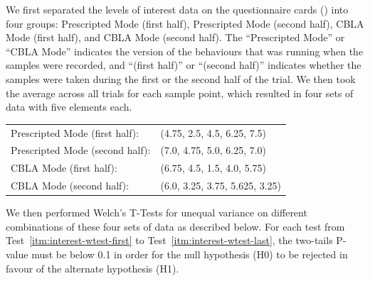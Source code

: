 We first separated the levels of interest data on the questionnaire cards () into four groups: Prescripted Mode (first half),  Prescripted Mode (second half),  CBLA Mode (first half), and CBLA Mode (second half). The ``Prescripted Mode'' or ``CBLA Mode'' indicates the version of the behaviours that was running when the samples were recorded, and ``(first half)'' or ``(second half)'' indicates whether the samples were taken during the first or the second half of the trial. We then took the average across all trials for each sample point, which resulted in four sets of data with five elements each.

\begin{tabular}{l l}
	Prescripted Mode (first half):      &(4.75, 2.5, 4.5, 6.25, 7.5) \\
	Prescripted Mode (second half):     &(7.0, 4.75, 5.0, 6.25, 7.0) \\
	CBLA Mode (first half):             &(6.75, 4.5, 1.5, 4.0, 5.75) \\
	CBLA Mode (second half):            &(6.0, 3.25, 3.75, 5.625, 3.25)	
\end{tabular}

We then performed Welch's T-Tests for unequal variance on different combinations of these four sets of data as described below. For each test from Test~\ref{itm:interest-wtest-first} to Test~\ref{itm:interest-wtest-last}, the two-tails P-value must be below 0.1 in order for the null hypothesis (H0) to be rejected in favour of the alternate hypothesis (H1).

